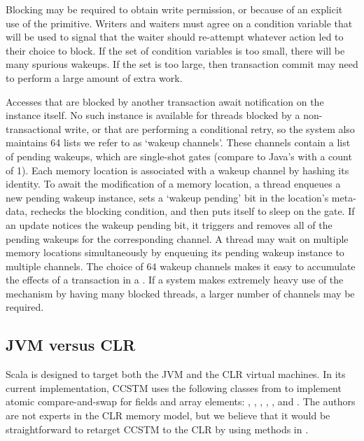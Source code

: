 Blocking may be required to obtain write permission, or because of an
explicit use of the  primitive.  Writers and waiters must
agree on a condition variable that will be used to signal that the
waiter should re-attempt whatever action led to their choice to block.
If the set of condition variables is too small, there will be many
spurious wakeups.  If the set is too large, then transaction commit may need to
perform a large amount of extra work.

Accesses that are blocked by another transaction await notification
on the  instance itself.  No such instance is available for
threads blocked by a non-transactional write, or that are performing a
conditional retry, so the system also maintains 64 lists we refer to as
`wakeup channels'.  These channels contain a list of pending wakeups,
which are single-shot gates (compare to Java's 
with a count of 1).  Each memory location is associated with a wakeup
channel by hashing its identity.  To await the modification of a
memory location, a thread enqueues a new pending wakeup instance,
sets a `wakeup pending' bit in the location's meta-data, rechecks the
blocking condition, and then puts itself to sleep on the gate.  If an
update notices the wakeup pending bit, it triggers and removes all of
the pending wakeups for the corresponding channel.  A thread may wait on
multiple memory locations simultaneously by enqueuing its pending wakeup
instance to multiple channels.  The choice of 64 wakeup channels makes
it easy to accumulate the effects of a transaction in a .
If a system makes extremely heavy use of the  mechanism by
having many blocked threads, a larger number of channels may be required.

\subsection{JVM versus CLR}

Scala is designed to target both the JVM and the CLR virtual
machines.  In its current implementation, CCSTM uses the following
classes from  to implement atomic
compare-and-swap for fields and array elements: ,
, , ,
, and .
The authors are not experts in the CLR memory model, but we believe
that it would be straightforward to retarget CCSTM to the CLR by using
methods in .

